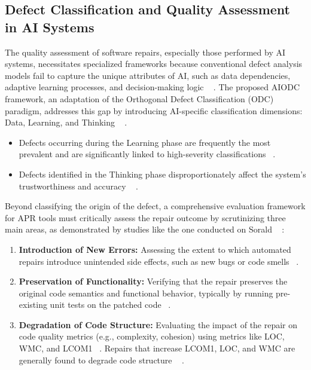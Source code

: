 \subsection*{Defect Classification and Quality Assessment in AI Systems}
The quality assessment of software repairs, especially those performed by AI systems, necessitates specialized frameworks because conventional defect analysis models fail to capture the unique attributes of AI, such as data dependencies, adaptive learning processes, and decision-making logic ~\cite{alannsary2025}
.
The proposed AIODC framework, an adaptation of the Orthogonal Defect Classification (ODC) paradigm, addresses this gap by introducing AI-specific classification dimensions: Data, Learning, and Thinking ~\cite{alannsary2025}
. \begin{itemize} \item Defects occurring during the Learning phase are frequently the most prevalent and are significantly linked to high-severity classifications ~\cite{alannsary2025}. \item Defects identified in the Thinking phase disproportionately affect the system's trustworthiness and accuracy ~\cite{alannsary2025}
. \end{itemize}
Beyond classifying the origin of the defect, a comprehensive evaluation framework for APR tools must critically assess the repair outcome by scrutinizing three main areas, as demonstrated by studies like the one conducted on Sorald ~\cite{liyanage2025}
: \begin{enumerate} \item \textbf{Introduction of New Errors:} Assessing the extent to which automated repairs introduce unintended side effects, such as new bugs or code smells ~\cite{liyanage2025}. \item \textbf{Preservation of Functionality:} Verifying that the repair preserves the original code semantics and functional behavior, typically by running pre-existing unit tests on the patched code ~\cite{liyanage2025}. \item \textbf{Degradation of Code Structure:} Evaluating the impact of the repair on code quality metrics (e.g., complexity, cohesion) using metrics like LOC, WMC, and LCOM1 ~\cite{liyanage2025}. Repairs that increase LCOM1, LOC, and WMC are generally found to degrade code structure ~\cite{liyanage2025}
. \end{enumerate}
